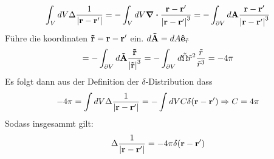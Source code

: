   \begin{equation*}
    \int_V dV \Delta \frac{1}{\abs{\vb{r}-\vb{r}'}} 
    = -\int_V dV \div \frac{\vb r - \vb r'}{\abs{\vb r - \vb r'}^3} 
    = -\int_{\partial V} 
    d\vb A \frac{\vb r - \vb r'}{\abs{\vb r - \vb r'}^3}
  \end{equation*}
  Führe die koordinaten $\vb {\tilde r} = \vb r-\vb r'$ ein.
  $d\vb {\tilde A}=dA \vu e_{\tilde r}$
  \begin{equation*}
    = -\int_{\partial V} 
    d\vb{ \tilde A} \frac{\vb {\tilde r}}{\abs{\vb{\tilde r}}^3}
    = -\int_{\partial V} 
    d\tilde \Omega \tilde r^2 \frac{\tilde r}{\tilde r^3} = -4\pi
  \end{equation*}
  Es folgt dann aus der Definition der $\delta$-Distribution dass
  \begin{equation*}
    -4\pi = \int dV \Delta \frac{1}{\abs{\vb{r}-\vb{r}'}} = -\int dV C\delta(\vb r - \vb r')
    \Rightarrow C=4\pi
  \end{equation*}
  Sodass insgesammt gilt:
  \begin{equation*}
    \Delta \frac{1}{\abs{\vb{r}-\vb{r}'}} = -4\pi \delta (\vb r - \vb r')
  \end{equation*}
   

